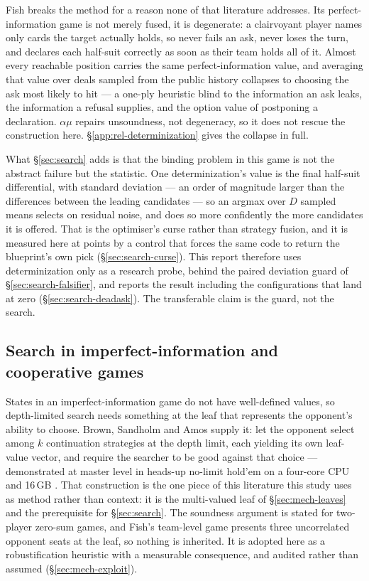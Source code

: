 Fish breaks the method for a reason none of that literature addresses. Its
perfect-information game is not merely fused, it is degenerate: a clairvoyant
player names only cards the target actually holds, so never fails an ask, never
loses the turn, and declares each half-suit correctly as soon as their team
holds all of it. Almost every reachable position carries the same
perfect-information value, and averaging that value over deals sampled from the
public history collapses to choosing the ask most likely to hit --- a one-ply
heuristic blind to the information an ask leaks, the information a refusal
supplies, and the option value of postponing a declaration.
$\alpha\mu$ repairs unsoundness, not degeneracy, so it does not rescue the
construction here. \S\ref{app:rel-determinization} gives the collapse in full.

What \S\ref{sec:search} adds is that the binding problem in this game is not the
abstract failure but the statistic. One determinization's value is the final
half-suit differential, with standard deviation \vsixLeafSd{} --- an order of
magnitude larger than the differences between the leading candidates --- so an
argmax over $D$ sampled means selects on residual noise, and does so more
confidently the more candidates it is offered. That is the optimiser's curse
rather than strategy fusion, and it is measured here at \vsixCurseGap{} points
by a control that forces the same code to return the blueprint's own pick
(\S\ref{sec:search-curse}). This report therefore uses determinization only as a
research probe, behind the paired deviation guard of \S\ref{sec:search-falsifier},
and reports the result including the configurations that land at zero
(\S\ref{sec:search-deadask}). The transferable claim is the guard, not the
search.

\subsection{Search in imperfect-information and cooperative games}
\label{sec:related-search}

States in an imperfect-information game do not have well-defined values, so
depth-limited search needs something at the leaf that represents the opponent's
ability to choose. Brown, Sandholm and Amos supply it: let the opponent select
among $k$ continuation strategies at the depth limit, each yielding its own
leaf-value vector, and require the searcher to be good against that choice ---
demonstrated at master level in heads-up no-limit hold'em on a four-core CPU and
16\,GB \cite{brown2018depthlimited}. That construction is the one piece of this
literature this study uses as method rather than context: it is the multi-valued
leaf of \S\ref{sec:mech-leaves} and the prerequisite for
\S\ref{sec:search}. The soundness argument is stated for two-player zero-sum
games, and Fish's team-level game presents three uncorrelated opponent seats at
the leaf, so nothing is inherited. It is adopted here as a robustification
heuristic with a measurable consequence, and audited rather than assumed
(\S\ref{sec:mech-exploit}).

